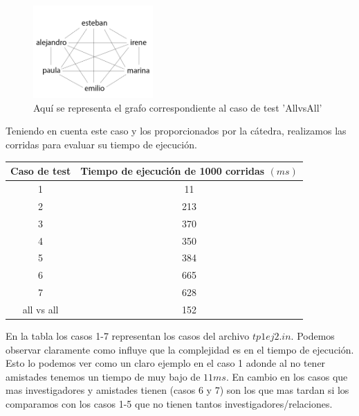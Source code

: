 \begin{figure}[h]
\centering                                                       
        \includegraphics[width=130pt]{./figs/todosVStodos.png}
	\caption{Aquí se representa el grafo correspondiente al caso de test 'AllvsAll'}
	\label{fig:tvst}
\end{figure}
\indent Teniendo en cuenta este caso y los proporcionados por la cátedra, realizamos las corridas para evaluar su tiempo de ejecución.
\begin{center}
\begin{tabular}{|c|c|}
  \hline
  Caso de test & Tiempo de ejecución de 1000 corridas $(ms)$   \\
  \hline
  1        &  11   \\
  \hline
  2        & 213\\
  \hline
  3        & 370      \\
  \hline
  4        & 350        \\
  \hline
  5  	   & 384    \\
  \hline
  6        & 665\\
  \hline
   7 	& 628        \\
  \hline  
  all vs all 	& 152        \\
  \hline
\end{tabular}
\end{center}
\indent En la tabla los casos 1-7 representan los casos del archivo $tp1ej2.in$.
\indent Podemos observar claramente como influye que la complejidad es  en el tiempo de ejecución. 
Esto lo podemos ver como un claro ejemplo en el caso 1 adonde al no tener amistades tenemos un tiempo de muy bajo de $11ms$.
En cambio en los casos que mas investigadores y amistades tienen (casos 6 y 7) son los que mas tardan si los comparamos con los casos 1-5 que no tienen tantos investigadores/relaciones.
